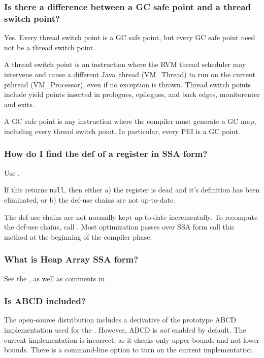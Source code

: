 \subsubsection{Is there a difference between a GC safe point and a thread
switch point?}

Yes.  Every thread switch point is a GC safe point, but every GC safe point 
need not be a thread switch point.

A thread switch point is an instruction where the RVM thread scheduler may
intervene and cause a different Java\JavaTMFootnote\ thread (VM\_Thread) to
run on the current 
pthread (VM\_Processor), even if no exception is thrown.  
Thread switch points include yield points inserted in prologues, epilogues, 
and back edges, monitorenter and exits.

A GC safe point is any instruction where the compiler must generate a GC map, 
including every thread switch point.  In particular, every 
PEI is a GC point.

\subsubsection{How do I find the def of a register in SSA form?}

Use 
.

If this returns {\tt null}, then either a) the register is dead and it's definition has been eliminated, 
or b) the def-use chains are not up-to-date.

The def-use chains are not normally kept up-to-date incrementally.  To
recompute the def-use chains, call 
. 
Most optimization passes over SSA form call this method at 
the beginning of the compiler phase.

\subsubsection{What is Heap Array SSA form?}

See the , as well as comments in
.

\subsubsection{Is ABCD included?}

The open-source distribution includes a derivative of the prototype ABCD 
implementation used for the 
.
However, ABCD is {\em not} enabled by default.  The current implementation
is incorrect, as it checks only upper bounds and not lower bounds.
There is a command-line option to turn on the current implementation.


